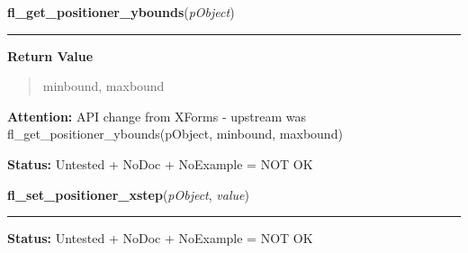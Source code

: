     \label{xformslib:library:fl_get_positioner_ybounds}

    \vspace{0.5ex}

\hspace{.8\funcindent}\begin{boxedminipage}{\funcwidth}

    \raggedright \textbf{fl\_get\_positioner\_ybounds}(\textit{pObject})

    \vspace{-1.5ex}

    \rule{\textwidth}{0.5\fboxrule}
\setlength{\parskip}{2ex}
\setlength{\parskip}{1ex}
      \textbf{Return Value}
    \vspace{-1ex}

      \begin{quote}
      minbound, maxbound

      \end{quote}

\textbf{Attention:} API change from XForms - upstream was fl\_get\_positioner\_ybounds(pObject,
minbound, maxbound)



\textbf{Status:} Untested + NoDoc + NoExample = NOT OK



    \end{boxedminipage}

    \label{xformslib:library:fl_set_positioner_xstep}

    \vspace{0.5ex}

\hspace{.8\funcindent}\begin{boxedminipage}{\funcwidth}

    \raggedright \textbf{fl\_set\_positioner\_xstep}(\textit{pObject}, \textit{value})

    \vspace{-1.5ex}

    \rule{\textwidth}{0.5\fboxrule}
\setlength{\parskip}{2ex}
\setlength{\parskip}{1ex}
\textbf{Status:} Untested + NoDoc + NoExample = NOT OK



    \end{boxedminipage}

